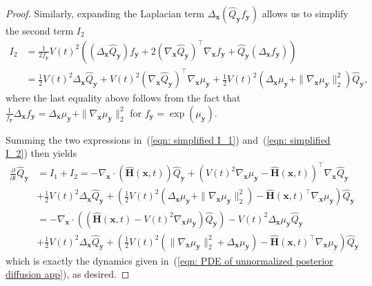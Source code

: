 \documentclass{article}
\numberwithin{equation}{section}
\def\eqref#1{(\ref{#1})}
\def\vx{{\bm{x}}}
\def\vy{{\bm{y}}}
\def\mH{{\bm{H}}}
\begin{document}
\begin{proof}
    Similarly, expanding the Laplacian term $\Delta_{\vx}(\widehat{Q}_{\vy}f_{\vy})$ allows us to simplify the second term $I_2$
    \begin{equation}
    \label{eqn: simplified I_2}
    \begin{aligned}
    I_2 &= \frac{1}{2f_{\vy}}V(t)^2\left(
    \left(\Delta_{\vx}\widehat{Q}_{\vy}\right)f_{\vy} + 2\left(\nabla_{\vx}\widehat{Q}_{\vy}\right)^\intercal\nabla_{\vx}f_{\vy} + \widehat{Q}_{\vy}\left(\Delta_{\vx}f_{\vy}\right)\right)\\
    &= \frac{1}{2}V(t)^2\Delta_{\vx}\widehat{Q}_{\vy} + V(t)^2\left(\nabla_{\vx}\widehat{Q}_{\vy}\right)^\intercal\nabla_{\vx}\mu_{\vy} + \frac{1}{2}V(t)^2\left(\Delta_{\vx}\mu_{\vy} + \|\nabla_{\vx}\mu_{\vy}\|_2^2\right)\widehat{Q}_{\vy},
    \end{aligned}    
    \end{equation}
    where the last equality above follows from the fact that $\frac{1}{f_{\vy}}\Delta_{\vx} f_{\vy} = \Delta_{\vx}\mu_{\vy} + \|\nabla_{\vx}\mu_{\vy}\|_2^2$ for $f_{\vy} = \exp(\mu_{\vy})$. 
    
    Summing the two expressions in~\eqref{eqn: simplified I_1} and~\eqref{eqn: simplified I_2} then yields
    \begin{equation}
    \begin{aligned}
    \frac{\partial}{\partial t}\widehat{Q}_{\vy} &= I_1 + I_2 = -\nabla_{\vx} \cdot \left(\widehat{\mH}(\vx,t)\right)\widehat{Q}_{\vy} + \left(V(t)^2\nabla_{\vx}\mu_{\vy} - \widehat{\mH}(\vx,t) \right)^\intercal\nabla_{\vx}\widehat{Q}_{\vy}\\
    &+ \frac{1}{2}V(t)^2\Delta_{\vx}\widehat{Q}_{\vy} + \left(\frac{1}{2}V(t)^2\left(\Delta_{\vx}\mu_{\vy} + \|\nabla_{\vx}\mu_{\vy}\|_2^2\right) -\widehat{\mH}(\vx,t) ^\intercal\nabla_{\vx}\mu_{\vy}\right)\widehat{Q}_{\vy}\\
    &=-\nabla_{\vx} \cdot \left(\left(\widehat{\mH}(\vx,t)-V(t)^2\nabla_{\vx}\mu_{\vy}\right)\widehat{Q}_{\vy}\right) - V(t)^2\Delta_{\vx}\mu_{\vy}\widehat{Q}_{\vy}\\
    &+ \frac{1}{2}V(t)^2\Delta_{\vx}\widehat{Q}_{\vy} + \left(\frac{1}{2}V(t)^2\left(\|\nabla_{\vx}\mu_{\vy}\|_2^2 + \Delta_{\vx}\mu_{\vy}\right) - \widehat{\mH}(\vx,t)^\intercal\nabla_{\vx}\mu_{\vy}\right)\widehat{Q}_{\vy}
    \end{aligned}    
    \end{equation}
    which is exactly the dynamics given in~\eqref{eqn: PDE of unnormalized posterior diffusion app}, as desired. 
\end{proof}
\end{document}
